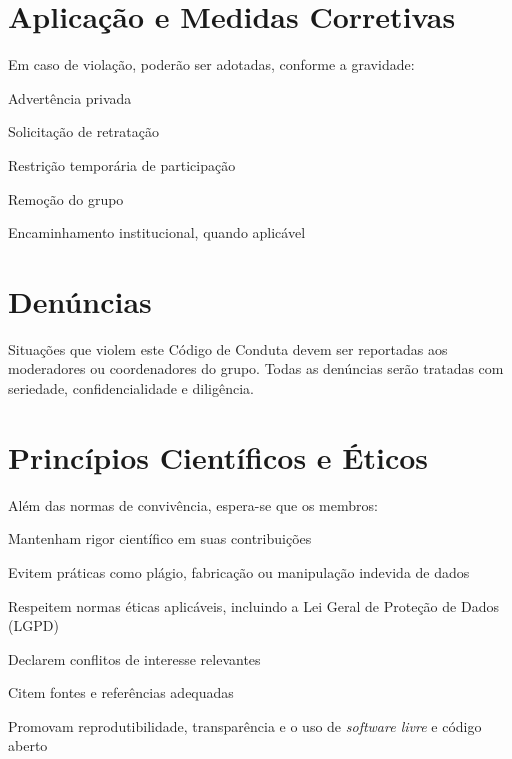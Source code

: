 \documentclass[
  12pt,          %
  a4paper,       %
  oneside,       %
  brazil         %
]{article}
\begin{document}
\section{Aplicação e Medidas Corretivas}

Em caso de violação, poderão ser adotadas, conforme a gravidade:

\begin{conduta}
  \item Advertência privada
  \item Solicitação de retratação
  \item Restrição temporária de participação
  \item Remoção do grupo
  \item Encaminhamento institucional, quando aplicável
\end{conduta}

\section{Denúncias}

Situações que violem este Código de Conduta devem ser reportadas aos moderadores ou coordenadores do grupo. 
Todas as denúncias serão tratadas com seriedade, confidencialidade e diligência.

\section{Princípios Científicos e Éticos}

Além das normas de convivência, espera-se que os membros:

\begin{conduta}
  \item Mantenham rigor científico em suas contribuições
  \item Evitem práticas como plágio, fabricação ou manipulação indevida de dados
  \item Respeitem normas éticas aplicáveis, incluindo a Lei Geral de Proteção de Dados (LGPD)
  \item Declarem conflitos de interesse relevantes
  \item Citem fontes e referências adequadas
  \item Promovam reprodutibilidade, transparência e o uso de \textit{software livre} e código aberto
  
\end{conduta}
\end{document}

